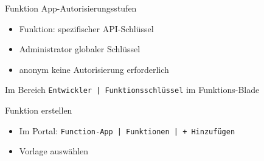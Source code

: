 \begin{flashcard}[Definition]{Funktion App-Autorisierungsstufen}
    \begin{itemize}
        \item Funktion:\newline
            spezifischer API-Schlüssel
        \item Administrator\newline
            globaler Schlüssel
        \item anonym\newline
            keine Autorisierung erforderlich
    \end{itemize}
    Im Bereich \texttt{Entwickler | Funktionsschlüssel} im Funktions-Blade
\end{flashcard}

\begin{flashcard}[Definition]{Funktion erstellen}
    \begin{itemize}
        \item Im Portal:\newline
            \texttt{Function-App | Funktionen | + Hinzufügen}
        \item Vorlage auswählen
    \end{itemize}
\end{flashcard}

